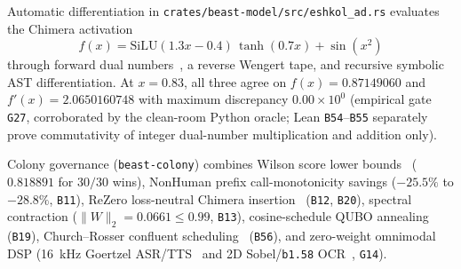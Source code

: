 \documentclass[11pt,letterpaper]{amsart}
\newcommand{\code}[1]{{\small\texttt{#1}}}
\begin{document}
Automatic differentiation in \code{crates/beast-model/src/eshkol\_ad.rs} evaluates
the Chimera activation~\cite{elfwing2018sigmoid}
\begin{equation}
  f(x) = \mathrm{SiLU}(1.3x - 0.4)\,\tanh(0.7x) + \sin(x^2)
\end{equation}
through forward dual numbers~\cite{baydin2018automatic,griewank2008evaluating},
a reverse Wengert tape, and recursive symbolic AST differentiation. At $x = 0.83$,
all three agree on $f(x) = 0.87149060$ and $f'(x) = 2.0650160748$ with maximum
discrepancy $0.00 \times 10^0$ (empirical gate \code{G27}, corroborated by the
clean-room Python oracle; Lean \code{B54}--\code{B55} separately prove
commutativity of integer dual-number multiplication and addition only).

Colony governance (\code{beast-colony}) combines Wilson score lower
bounds~\cite{wilson1927probable} ($0.818891$ for $30/30$ wins), NonHuman prefix
call-monotonicity savings ($-25.5\%$ to $-28.8\%$, \code{B11}), ReZero
loss-neutral Chimera insertion~\cite{bachlechner2021rezero} (\code{B12}, \code{B20}),
spectral contraction ($\|W\|_2 = 0.0661 \le 0.99$, \code{B13}), cosine-schedule
QUBO annealing~\cite{kirkpatrick1983optimization,glover2019qubo,lucas2014ising}
(\code{B19}), Church--Rosser confluent scheduling~\cite{church1936conversion}
(\code{B56}), and zero-weight omnimodal DSP (16~kHz Goertzel
ASR/TTS~\cite{goertzel1958algorithm,nyquist1928certain} and 2D Sobel/\code{b1.58}
OCR~\cite{kanopoulos1988sobel}, \code{G14}).
\end{document}
